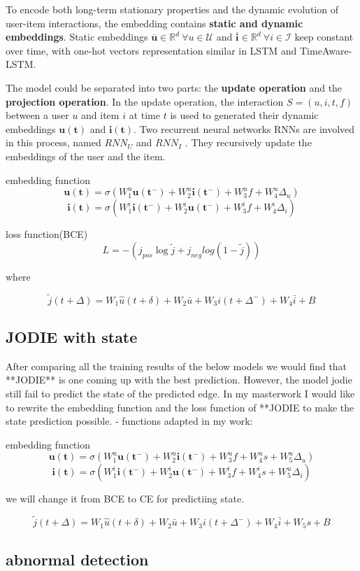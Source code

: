 To encode both long-term stationary properties and the dynamic evolution of user-item interactions, the embedding contains \textbf{static and dynamic embeddings}. Static embeddings $\mathbf{\overline{u} } \in \mathbb{R} ^d \ \forall u \in \mathcal{U}$ and $\mathbf{\overline{i} } \in \mathbb{R} ^d \ \forall i \in \mathcal{I}$ keep constant over time, with one-hot vectors representation similar in LSTM\cite{zhu2017next} and TimeAware-LSTM\cite{baytas2017patient}.


The model could be separated into two parts: the \textbf{update operation} and the \textbf{projection operation}. In the update operation, the interaction $S=(u,i,t,f)$ between a user $u$ and item $i$ at time $t$ is used to generated their dynamic embeddings $\mathbf{u(t)}$ and $\mathbf{i(t)}$. Two recurrent neural networks RNNs are involved in this process, named $RNN_U$ and  $RNN_I$ . They recursively update the embeddings of the user and the item. 





embedding function
$$ \mathbf{u(t)}=\sigma(W_1^u\mathbf{u(t^-)}+W_2^u\mathbf{i(t^-)}+W_3^uf+W^u_4 \Delta _u)$$
$$ \mathbf{i(t)}=\sigma(W_1^i\mathbf{i(t^-)}+W_2^i\mathbf{u(t^-)}+W_3^if+W^i_4 \Delta _i)$$

loss function(BCE)
$$L=-(j_{pos}\log{\tilde{j}}+j_{neg}log(1-\tilde{j}))$$

where

$$\tilde{j}(t+\Delta)=W_1\hat{u}(t+\delta)+W_2\bar{u}+W_3i(t+\Delta ^-)+W_4\bar{i}+B$$



\subsection{JODIE with state}
After comparing all the training results of the below models we would find that **JODIE** is one coming up with the best prediction. However, the model jodie still fail to predict the state of the predicted edge.
In my masterwork I would like to rewrite the embedding function and the loss function of **JODIE to make the state prediction possible.
- functions adapted in my work:

embedding function
$$ \mathbf{u(t)}=\sigma(W_1^u\mathbf{u(t^-)}+W_2^u\mathbf{i(t^-)}+W_3^uf+W^u_4s+W^u_5\Delta _u)$$
$$ \mathbf{i(t)}=\sigma(W_1^i\mathbf{i(t^-)}+W_2^i\mathbf{u(t^-)}+W_3^if+W^i_4s+W^u_5 \Delta _i)$$

we will change it from BCE to CE for predictiing state.

$$\tilde{j}(t+\Delta)=W_1\hat{u}(t+\delta)+W_2\bar{u}+W_3i(t+\Delta ^-)+W_4\bar{i}+W_5s+B$$

\subsection{abnormal detection}